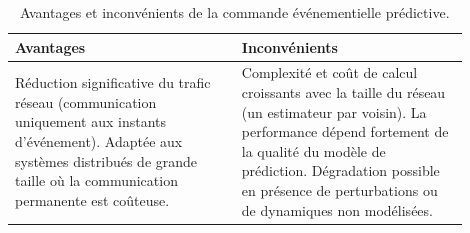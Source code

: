 \begin{table}[h!]
  \centering
  \caption{Avantages et inconvénients de la commande événementielle prédictive.}
  \begin{tabular}{|p{0.45\linewidth}|p{0.45\linewidth}|}
  \hline
  \textbf{Avantages} & \textbf{Inconvénients} \\
  \hline
  Réduction significative du trafic réseau (communication uniquement aux instants d'événement). \newline
  Adaptée aux systèmes distribués de grande taille où la communication permanente est coûteuse.
  & 
  Complexité et coût de calcul croissants avec la taille du réseau (un estimateur par voisin). \newline
  La performance dépend fortement de la qualité du modèle de prédiction. \newline
  Dégradation possible en présence de perturbations ou de dynamiques non modélisées. \\
  \hline
  \end{tabular}
  \label{tab:avantages_inconvenients_cmd_pred}
  \end{table}

